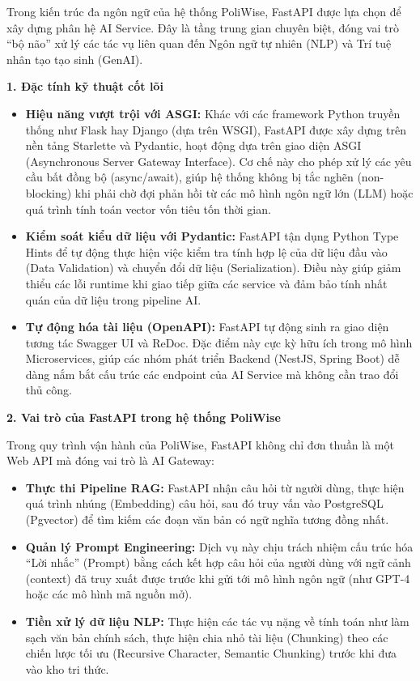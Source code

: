 \documentclass[12pt,a4paper]{report}
\begin{document}
Trong kiến trúc đa ngôn ngữ của hệ thống PoliWise, FastAPI được lựa chọn để xây dựng phân hệ AI Service. Đây là tầng trung gian chuyên biệt, đóng vai trò ``bộ não'' xử lý các tác vụ liên quan đến Ngôn ngữ tự nhiên (NLP) và Trí tuệ nhân tạo tạo sinh (GenAI).

\textbf{1. Đặc tính kỹ thuật cốt lõi}
\begin{itemize}
    \item \textbf{Hiệu năng vượt trội với ASGI:} Khác với các framework Python truyền thống như Flask hay Django (dựa trên WSGI), FastAPI được xây dựng trên nền tảng Starlette và Pydantic, hoạt động dựa trên giao diện ASGI (Asynchronous Server Gateway Interface). Cơ chế này cho phép xử lý các yêu cầu bất đồng bộ (async/await), giúp hệ thống không bị tắc nghẽn (non-blocking) khi phải chờ đợi phản hồi từ các mô hình ngôn ngữ lớn (LLM) hoặc quá trình tính toán vector vốn tiêu tốn thời gian.
    \item \textbf{Kiểm soát kiểu dữ liệu với Pydantic:} FastAPI tận dụng Python Type Hints để tự động thực hiện việc kiểm tra tính hợp lệ của dữ liệu đầu vào (Data Validation) và chuyển đổi dữ liệu (Serialization). Điều này giúp giảm thiểu các lỗi runtime khi giao tiếp giữa các service và đảm bảo tính nhất quán của dữ liệu trong pipeline AI.
    \item \textbf{Tự động hóa tài liệu (OpenAPI):} FastAPI tự động sinh ra giao diện tương tác Swagger UI và ReDoc. Đặc điểm này cực kỳ hữu ích trong mô hình Microservices, giúp các nhóm phát triển Backend (NestJS, Spring Boot) dễ dàng nắm bắt cấu trúc các endpoint của AI Service mà không cần trao đổi thủ công.
\end{itemize}

\textbf{2. Vai trò của FastAPI trong hệ thống PoliWise}

Trong quy trình vận hành của PoliWise, FastAPI không chỉ đơn thuần là một Web API mà đóng vai trò là AI Gateway:
\begin{itemize}
    \item \textbf{Thực thi Pipeline RAG:} FastAPI nhận câu hỏi từ người dùng, thực hiện quá trình nhúng (Embedding) câu hỏi, sau đó truy vấn vào PostgreSQL (Pgvector) để tìm kiếm các đoạn văn bản có ngữ nghĩa tương đồng nhất.
    \item \textbf{Quản lý Prompt Engineering:} Dịch vụ này chịu trách nhiệm cấu trúc hóa ``Lời nhắc'' (Prompt) bằng cách kết hợp câu hỏi của người dùng với ngữ cảnh (context) đã truy xuất được trước khi gửi tới mô hình ngôn ngữ (như GPT-4 hoặc các mô hình mã nguồn mở).
    \item \textbf{Tiền xử lý dữ liệu NLP:} Thực hiện các tác vụ nặng về tính toán như làm sạch văn bản chính sách, thực hiện chia nhỏ tài liệu (Chunking) theo các chiến lược tối ưu (Recursive Character, Semantic Chunking) trước khi đưa vào kho tri thức.
\end{itemize}
\end{document}
